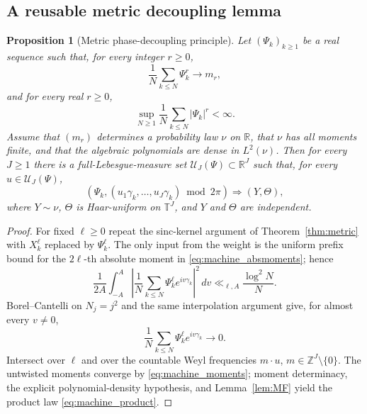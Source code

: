 \documentclass[pdflatex,sn-mathphys-num]{sn-jnl}
\numberwithin{equation}{section}
\theoremstyle{thmstyleone}
\newtheorem{proposition}[theorem]{Proposition}
\theoremstyle{thmstylethree}
\theoremstyle{thmstyletwo}
\newcommand{\R}{\mathbb R}
\newcommand{\Z}{\mathbb Z}
\newcommand{\Torus}{\mathbb T}
\newcommand{\1}{\mathbf 1}
\begin{document}
\subsection{A reusable metric decoupling lemma}

\begin{proposition}[Metric phase-decoupling principle]
\label{prop:machine}
Let $(\Psi_k)_{k\ge1}$ be a real sequence such that, for every integer $r\ge0$,
\begin{equation}
 \frac1N\sum_{k\le N}\Psi_k^r\longrightarrow m_r,
\label{eq:machine_moments}
\end{equation}
and for every real $r\ge0$,
\begin{equation}
 \sup_{N\ge1}\frac1N\sum_{k\le N}|\Psi_k|^r<\infty.
\label{eq:machine_absmoments}
\end{equation}
Assume that \((m_r)\) determines a probability law \(\nu\) on \(\R\), that
\(\nu\) has all moments finite, and that the algebraic polynomials are dense
in \(L^2(\nu)\).  Then for every \(J\ge1\) there is a full-Lebesgue-measure set $\mathcal U_J(\Psi)\subset\R^J$ such that, for every $u\in\mathcal U_J(\Psi)$,
\begin{equation}
 \left(\Psi_k,(u_1\gamma_k,\ldots,u_J\gamma_k)\bmod2\pi\right)
 \Longrightarrow (Y,\Theta),
\label{eq:machine_product}
\end{equation}
where $Y\sim\nu$, $\Theta$ is Haar-uniform on $\Torus^J$, and $Y$ and $\Theta$ are independent.
\end{proposition}

\begin{proof}
For fixed $\ell\ge0$ repeat the sinc-kernel argument of Theorem~\ref{thm:metric} with $X_k^\ell$ replaced by $\Psi_k^\ell$.  The only input from the weight is the uniform prefix bound for the $2\ell$-th absolute moment in \eqref{eq:machine_absmoments}; hence
\begin{equation}
 \frac1{2A}\int_{-A}^{A}\left|\frac1N\sum_{k\le N}\Psi_k^\ell e^{iv\gamma_k}\right|^2\,dv
 \ll_{\ell,A}\frac{\log^2N}{N}.
\label{eq:machine_L2}
\end{equation}
Borel--Cantelli on $N_j=j^2$ and the same interpolation argument give, for almost every $v\ne0$,
\begin{equation}
 \frac1N\sum_{k\le N}\Psi_k^\ell e^{iv\gamma_k}\longrightarrow0.
\label{eq:machine_twisted}
\end{equation}
Intersect over $\ell$ and over the countable Weyl frequencies $m\cdot u$, $m\in\Z^J\setminus\{0\}$.  The untwisted moments converge by \eqref{eq:machine_moments}; moment
determinacy, the explicit polynomial-density hypothesis, and
Lemma~\ref{lem:MF} yield the product law \eqref{eq:machine_product}.
\end{proof}
\end{document}
